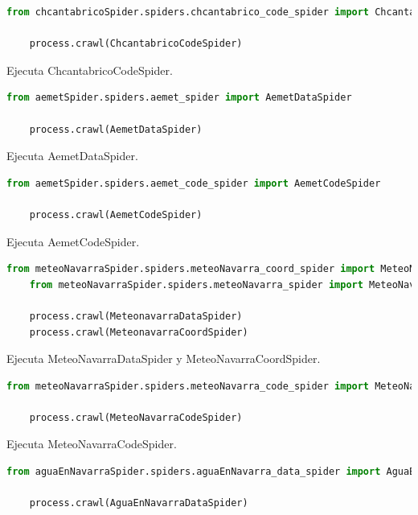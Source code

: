 \begin{lstlisting}[language=Python, caption={CHCantábrico Code Runner}]
	from chcantabricoSpider.spiders.chcantabrico_code_spider import ChcantabricoCodeSpider

	process.crawl(ChcantabricoCodeSpider)
\end{lstlisting}

Ejecuta ChcantabricoCodeSpider.

\begin{lstlisting}[language=Python, caption={Aemet Data Runner}]
	from aemetSpider.spiders.aemet_spider import AemetDataSpider

	process.crawl(AemetDataSpider)
\end{lstlisting}

Ejecuta AemetDataSpider.

\begin{lstlisting}[language=Python, caption={Aemet Code Runner}]
	from aemetSpider.spiders.aemet_code_spider import AemetCodeSpider
	
	process.crawl(AemetCodeSpider)
\end{lstlisting}

Ejecuta AemetCodeSpider.

\begin{lstlisting}[language=Python, caption={MeteoNavarra Data Runner}]
	from meteoNavarraSpider.spiders.meteoNavarra_coord_spider import MeteoNavarraCoordSpider
	from meteoNavarraSpider.spiders.meteoNavarra_spider import MeteoNavarraDataSpider

	process.crawl(MeteonavarraDataSpider)
	process.crawl(MeteonavarraCoordSpider)	
\end{lstlisting}

Ejecuta MeteoNavarraDataSpider y MeteoNavarraCoordSpider.

\begin{lstlisting}[language=Python, caption={MeteoNavarra Code Runner}]
	from meteoNavarraSpider.spiders.meteoNavarra_code_spider import MeteoNavarraCodeSpider

	process.crawl(MeteoNavarraCodeSpider)
\end{lstlisting}

Ejecuta MeteoNavarraCodeSpider.

\begin{lstlisting}[language=Python, caption={Agua en Navarra Data Runner}]
	from aguaEnNavarraSpider.spiders.aguaEnNavarra_data_spider import AguaEnNavarraDataSpider
	
	process.crawl(AguaEnNavarraDataSpider)
\end{lstlisting}

